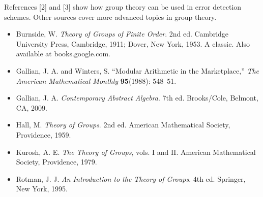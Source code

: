  
{\small
References [2] and [3] show  how group theory can be used in error
detection schemes.  Other sources cover more advanced
topics in group theory. 
\begin{itemize}
 
\item[{\bf [1]}]  %
Burnside, W. {\it Theory of Groups of Finite Order}. 2nd ed. Cambridge
University Press, Cambridge, 1911; Dover, New York, 1953.  A classic.  Also available at books.google.com.
 
\item[{\bf [2]}]
Gallian, J. A. and Winters, S. ``Modular Arithmetic in the
Marketplace,'' {\it The American Mathematical Monthly} {\bf
95}(1988): 548--51. 
 
\item[{\bf [3]}]  %
Gallian, J. A. 
{\it Contemporary Abstract Algebra}. 7th ed. Brooks/Cole, Belmont, CA, 2009. 
 
\item[{\bf [4]}]   %
Hall, M. {\it Theory of Groups}. 2nd ed. American Mathematical Society, Providence, 1959.

 
\item[{\bf [5]}] %
Kurosh, A. E. {\it The Theory of Groups}, vols. I and II. American Mathematical Society, Providence, 1979. 
 
 

% 
 
 
\item[{\bf [6]}] %
Rotman, J. J. {\it An Introduction to the Theory of
Groups}. 4th ed. Springer, New York, 1995.
 
\end{itemize}
}
 
 
 
